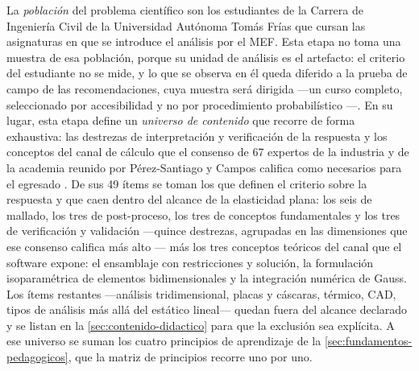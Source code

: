 La \emph{población} del problema científico son los estudiantes de la Carrera de Ingeniería Civil de la Universidad Autónoma Tomás Frías que cursan las asignaturas en que se introduce el análisis por el MEF. %
Esta etapa no toma una muestra de esa población, porque su unidad de análisis es el artefacto: el criterio del estudiante no se mide, y lo que se observa en él queda diferido a la prueba de campo de las recomendaciones, cuya muestra será dirigida —un curso completo, seleccionado por accesibilidad y no por procedimiento probabilístico \autocite[p.~215]{sampieri2018metodologia}—. En su lugar, esta etapa define un \emph{universo de contenido} que recorre de forma exhaustiva: las destrezas de interpretación y verificación de la respuesta y los conceptos del canal de cálculo que el consenso de 67 expertos de la industria y de la academia reunido por Pérez-Santiago y Campos califica como necesarios para el egresado \autocite[pp.~1162-1163]{perezsantiago2023fem}. De sus 49 ítems se toman los que definen el criterio sobre la respuesta y que caen dentro del alcance de la elasticidad plana: los seis de mallado, los tres de post-proceso, los tres de conceptos fundamentales y los tres de verificación y validación —quince destrezas, agrupadas en las dimensiones que ese consenso califica más alto \autocite[p.~1168]{perezsantiago2023fem}— más los tres conceptos teóricos del canal que el software expone: el ensamblaje con restricciones y solución, la formulación isoparamétrica de elementos bidimensionales y la integración numérica de Gauss. Los ítems restantes —análisis tridimensional, placas y cáscaras, térmico, CAD, tipos de análisis más allá del estático lineal— quedan fuera del alcance declarado y se listan en la \autoref{sec:contenido-didactico} para que la exclusión sea explícita. A ese universo se suman los cuatro principios de aprendizaje de la \autoref{sec:fundamentos-pedagogicos}, que la matriz de principios recorre uno por uno.

